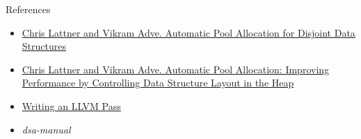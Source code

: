 \documentclass{beamer}
\begin{document}
\begin{frame}{References}
  \begin{itemize}
	\item \href{https://llvm.org/pubs/2002-06-AutomaticPoolAllocation.html}{Chris Lattner and Vikram Adve. Automatic Pool Allocation for Disjoint Data Structures}
	\item \href{https://llvm.org/pubs/2005-05-21-PLDI-PoolAlloc.html}{Chris Lattner and Vikram Adve. Automatic Pool Allocation: Improving Performance by Controlling Data Structure Layout in the Heap} 
	\item \href{http://llvm.org/docs/WritingAnLLVMPass.html}{Writing an LLVM Pass}
	\item \emph{dsa-manual}
  \end{itemize}
\end{frame}
\end{document}
